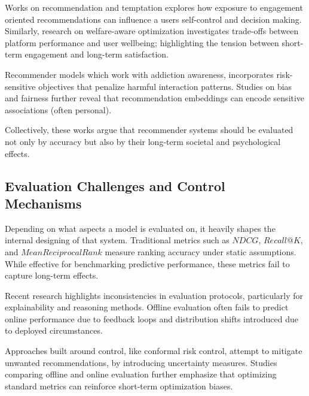 Works on recommendation and temptation explores how exposure to engagement 
oriented recommendations can influence a users self-control and decision making.
Similarly, research on welfare-aware optimization investigates trade-offs between
platform performance and user wellbeing; highlighting the tension between
short-term engagement and long-term satisfaction.
\cite{Milli2023EngagementUS,Wang2025LowerBH}

Recommender models which work with addiction awareness, incorporates 
risk-sensitive objectives that penalize harmful interaction patterns.
Studies on bias and fairness further reveal that recommendation 
embeddings can encode sensitive associations (often personal).
\cite{Wang2025LowerBH,Beattie2025UnderstandingSA}

Collectively, these works argue that recommender systems should be evaluated not 
only by accuracy but also by their long-term societal and psychological effects.
\cite{dignazi2025rewardingengagementpersonalizationpopularitybased}


\subsection{Evaluation Challenges and Control Mechanisms}

Depending on what aspects a model is evaluated on, 
it heavily shapes the internal designing of that system.
Traditional metrics such as $NDCG$, $Recall@K$, and $Mean Reciprocal Rank$ 
measure ranking accuracy under static assumptions.
While effective for benchmarking predictive performance,
these metrics fail to capture long-term effects.

Recent research highlights inconsistencies in evaluation protocols, 
particularly for explainability and reasoning methods.
Offline evaluation often fails to predict online performance due to 
feedback loops and distribution shifts introduced due to deployed circumstances.
\cite{10.1145/3705328.3748028}

Approaches built around control, like conformal risk control, attempt to
mitigate unwanted recommendations, by introducing uncertainty measures.
Studies comparing offline and online evaluation further emphasize that
optimizing standard metrics can reinforce short-term optimization biases.
\cite{detoni2025dontbringflowersmitigating}

